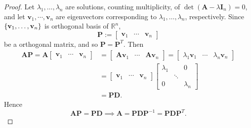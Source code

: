 \documentclass[12pt,openany]{book}
\theoremstyle{definition}
\newcommand{\R}{\mathbb{R}}
\renewcommand{\vec}[1]{\textbf{#1}}
\begin{document}
	\begin{proof}
		Let \(\lambda_1,\dots,\lambda_n\) are solutions, counting multiplicity, of \(\det(\textbf{A}-\lambda\textbf{I}_n)=0\), and let \(\vec{v}_1,\cdots,\vec{v}_n\) are eigenvectors corresponding to \(\lambda_1,\dots,\lambda_n\), respectively. Since \(\set{\vec{v}_1,\dots,\vec{v}_n}\) is orthogonal basis of \(\R^n\), \[
		\textbf{P}:=\begin{bmatrix}
			\vec{v}_1&\cdots&\vec{v}_n
		\end{bmatrix}
		\] be a orthogonal matrix, and so \(\textbf{P}=\textbf{P}^T\). Then 
		\begin{align*}\textbf{A}\textbf{P}=\textbf{A}\begin{bmatrix}
				\vec{v}_1&\cdots&\vec{v}_n
			\end{bmatrix}&=\begin{bmatrix}
				\textbf{A}\vec{v}_1&\cdots&\textbf{A}\vec{v}_n
			\end{bmatrix}=\begin{bmatrix}
			\lambda_1\vec{v}_1&\cdots&\lambda_n\vec{v}_n
		\end{bmatrix}\\
		&=\begin{bmatrix}
			\vec{v}_1&\cdots&\vec{v}_n
		\end{bmatrix}\begin{bmatrix}
			\lambda_1 &&0\\ &\ddots&\\0&&\lambda_n
		\end{bmatrix}\\
		&=\textbf{P}\textbf{D}.
		\end{align*} Hence \[
		\textbf{AP}=\textbf{PD}\implies\textbf{A}=\textbf{PD}\textbf{P}^{-1}=\textbf{PD}\textbf{P}^T.
		\]
	\end{proof}
\end{document}
